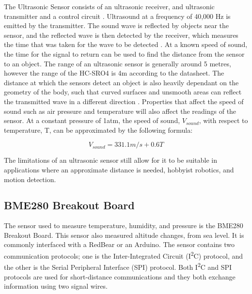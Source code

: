 \documentclass[11pt]{article}
\begin{document}
The Ultrasonic Sensor consists of an ultrasonic receiver, and ultrasonic transmitter and a control circuit \cite{HTM,Spark}. Ultrasound at a frequency of 40,000 Hz is emitted by the transmitter. The sound wave is reflected by objects near the sensor, and the reflected wave is then detected by the receiver, which measures the time that was taken for the wave to be detected \cite{HTM}. At a known speed of sound, the time for the signal to return can be used to find the distance from the sensor to an object. The range of an ultrasonic sensor is generally around 5 metres\cite{Prac}, however the range of the HC-SRO4 is 4m according to the datasheet. The distance at which the sensors detect an object is also heavily dependant on the geometry of the body, such that curved surfaces and unsmooth areas can reflect the transmitted wave in a different direction \cite{Prac}. Properties that affect the speed of sound such as air pressure and temperature will also affect the readings of the sensor. At a constant pressure of 1atm, the speed of sound, $V_{sound}$, with respect to temperature, T, can be approximated by the following formula\cite{Hyper}:

\begin{equation}
    V_{sound} = 331.1 m/s + 0.6T
\end{equation}    

The limitations of an ultrasonic sensor still allow for it to be suitable in applications where an approximate distance is needed, hobbyist robotics, and motion detection. \\

\subsection{BME280 Breakout Board}

The sensor used to measure temperature, humidity, and pressure is the BME280 Breakout Board. This sensor also measured altitude changes, from sea level. It is commonly interfaced with a RedBear or an Arduino. The sensor contains two communication protocols; one is the Inter-Integrated Circuit (I\textsuperscript{2}C) protocol, and the other is the Serial Peripheral Interface (SPI) protocol. Both I\textsuperscript{2}C and SPI protocols are used for short-distance communications and they both exchange information using two signal wires.\\
\end{document}
